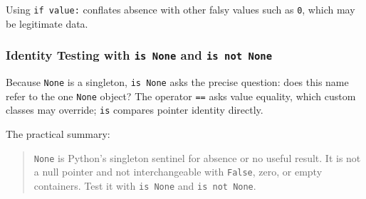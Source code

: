 Using \texttt{if value:} conflates absence with other falsy values such as \texttt{0}, which may be legitimate data.

\subsubsection{Identity Testing with \texttt{is None} and \texttt{is not None}}

Because \texttt{None} is a singleton, \texttt{is None} asks the precise question: does this name refer to the one \texttt{None} object? The operator \texttt{==} asks value equality, which custom classes may override; \texttt{is} compares pointer identity directly.

The practical summary:

\begin{quote}
\texttt{None} is Python's singleton sentinel for absence or no useful result. It is not a null pointer and not interchangeable with \texttt{False}, zero, or empty containers. Test it with \texttt{is None} and \texttt{is not None}.
\end{quote}
